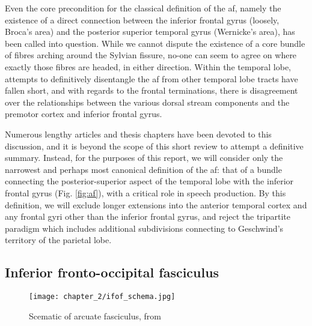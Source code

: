 Even the core precondition for the classical definition of the \gls{af}, namely the existence of a direct connection between the inferior frontal gyrus (loosely, Broca's area) and the posterior superior temporal gyrus (Wernicke's area), has been called into question.\autocite{Dick2012,Giampiccolo2022a}
While we cannot dispute the existence of a core bundle of fibres arching around the Sylvian fissure, no-one can seem to agree on where exactly those fibres are headed, in either direction.
Within the temporal lobe, attempts to definitively disentangle the \gls{af} from other temporal lobe tracts have fallen short,\autocite{Becker2022} and with regards to the frontal terminations, there is disagreement over the relationships between the various dorsal stream components and the premotor cortex and inferior frontal gyrus.\autocite{Kljajevic2014a,Giampiccolo2022a}

Numerous lengthy articles and thesis chapters have been devoted to this discussion, and it is beyond the scope of this short review to attempt a definitive summary.
Instead, for the purposes of this report, we will consider only the narrowest and perhaps most canonical definition of the \gls{af}: that of a bundle connecting the posterior-superior aspect of the temporal lobe with the inferior frontal gyrus (Fig. \ref{fig:af}), with a critical role in speech production.\autocite{Baldo2015}
By this definition, we will exclude longer extensions into the anterior temporal cortex\autocite{Giampiccolo2022a} and any frontal gyri other than the inferior frontal gyrus, and reject the tripartite paradigm which includes additional subdivisions connecting to Geschwind's territory of the parietal lobe.\autocite{Catani2005,Martino2013a}

\subsection{Inferior fronto-occipital fasciculus}


\begin{SCfigure}[][htb!]
  \texttt{[image: chapter\_2/ifof\_schema.jpg]}
  \caption{ Scematic of arcuate fasciculus, from \textcite{Geschwind1970}}
  \label{fig:ifof}
\end{SCfigure}

